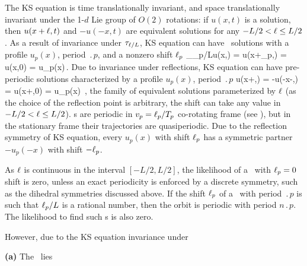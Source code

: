 The KS equation  is time translationally invariant, and
space translationally invariant under the 1-$d$ Lie group of $O(2)$
rotations: if $u(x,t)$ is a solution, then $u(x+\ell,t)$ and
$-u(-x,t)$ are equivalent solutions for any $-L/2 < \ell \leq
L/2$.
As a result of invariance under $\tau_{\ell/L}$,
KS equation can have \rpo\ solutions
with a profile $u_p(x)$, period $\period{p}$, and a
nonzero shift $\ell_p$
\beq
  \Shift_{\shift_p/L}u(x,) =
  u(x+\shift_p,) = u(x,0) = u_p(x)\,.
\label{KSrpos}
\eeq
Due to invariance under reflections, KS equation can have
pre-periodic solutions
characterized by a profile $u_p(x)$,
period $\period{p}$
\beq
  \Refl u(x+\shift,) =
  -u(-x-\shift,) = u(x+\shift,0) = u_p(x)
  \,,
\label{KSpos}
\eeq
the family of equivalent solutions
parameterized by $\ell$
(as the choice of the reflection point is arbitrary,
the shift can take any value in $-L/2 < \ell \leq L/2$).
{\Rpo s}  are periodic in
$v_p=\ell_p/{T_{p}}$ co-rotating frame (see
), but in the stationary frame their
trajectories are quasiperiodic.  Due to the reflection symmetry
 of KS equation, every {\rpo} $u_p(x)$ with shift
$\ell_p$ has a symmetric partner $-u_p(-x)$ with shift $-\ell_p$.


As $\ell$ is continuous in the interval $[-L/2, L/2]$,
the likelihood of a \rpo\ with $\ell_p = 0$ shift is zero,
unless an exact periodicity is enforced by a discrete symmetry,
such as the dihedral symmetries discussed above.
If the shift $\ell_p$ of a \rpo\ with period $\period{p}$ is such
that $\ell_p /L$ is a rational number, then the orbit is
periodic with period $n\period{p}$.  The likelihood to find such \po s is
also zero.

However, due to the KS equation invariance under 

{\bf (a)} The \po\ lies 

